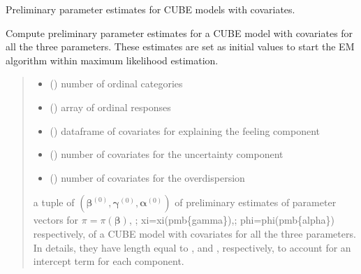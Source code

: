 \documentclass[letterpaper,10pt,english]{sphinxmanual}
\begin{document}
\begin{fulllineitems}
\label{\detokenize{cubmods:cubmods.cube_ywz.init_theta}}
\pysigstartsignatures
{}
\pysigstopsignatures
\sphinxAtStartPar
Preliminary parameter estimates for CUBE models with covariates.

\sphinxAtStartPar
Compute preliminary parameter estimates for a CUBE model with covariates for all the three parameters. 
These estimates are set as initial values to start the E\sphinxhyphen{}M algorithm within maximum likelihood estimation.
\begin{quote}\begin{description}
\begin{itemize}
\item {} 
\sphinxAtStartPar
{} () \textendash{} number of ordinal categories

\item {} 
\sphinxAtStartPar
{} () \textendash{} array of ordinal responses

\item {} 
\sphinxAtStartPar
{} () \textendash{} dataframe of covariates for explaining the feeling component

\item {} 
\sphinxAtStartPar
{} () \textendash{} number of covariates for the uncertainty component

\item {} 
\sphinxAtStartPar
{} () \textendash{} number of covariates for the overdispersion

\end{itemize}

\sphinxAtStartPar
a tuple of \((\pmb \beta^{(0)}, \pmb \gamma^{(0)}, \pmb \alpha^{(0)})\) of preliminary estimates of parameter vectors for 
\(\pi = \pi(\pmb{\beta})\), ; xi=xi(pmb\{gamma\}),; phi=phi(pmb\{alpha\})\textasciigrave{} respectively, of a CUBE model with covariates for all the three
parameters. In details, they have length equal to ,  and
, respectively, to account for an intercept term for each component.


\end{description}
\end{quote}
\end{fulllineitems}
\end{document}
